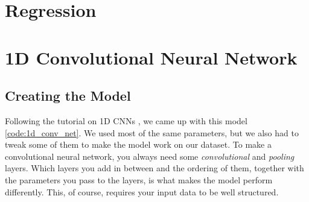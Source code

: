 \section{Regression}

\section{1D Convolutional Neural Network}

\subsection{Creating the Model}
Following the tutorial on 1D CNNs \cite{1d_cnn}, we came up with this model \ref{code:1d_conv_net}. 
We used most of the same parameters, but we also had to tweak some of them to make the model work on our dataset.
To make a convolutional neural network, you always need some \textit{convolutional} and \textit{pooling} layers.
Which layers you add in between and the ordering of them, together with the parameters you pass to the layers, 
is what makes the model perform differently. This, of course, requires your input data to be well structured.


